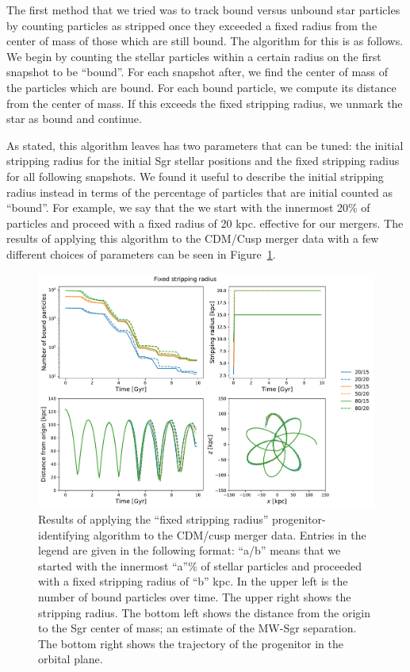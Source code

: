 The first method that we tried was to track bound versus unbound star
particles by counting particles as stripped once they exceeded a fixed radius
from the center of mass of those which are still bound.  The algorithm for
this is as follows.  We begin by counting the stellar particles within a
certain radius on the first snapshot to be ``bound''.  For each snapshot
after, we find the center of mass of the particles which are bound.  For each
bound particle, we compute its distance from the center of mass.  If this
exceeds the fixed stripping radius, we unmark the star as bound and continue.

As stated, this algorithm leaves has two parameters that can be tuned: the
initial stripping radius for the initial Sgr stellar positions and the fixed
stripping radius for all following snapshots. We found it useful to describe the
initial stripping radius instead in terms of the percentage of particles
that are initial counted as ``bound''. For example, we say that the we start
with the innermost 20\% of particles and proceed with a fixed radius of 20 kpc. 
effective for our mergers. The results of applying this algorithm to the
CDM/Cusp merger data with a few different choices of parameters can be seen in
Figure~\ref{fig:fixed_star}.

\begin{figure}
    \centering
    \includegraphics[width=0.9\linewidth]{figs/fixed_star.pdf}
    \caption{%
        Results of applying the ``fixed stripping radius''
        progenitor-identifying algorithm to the CDM/cusp merger data. Entries in
        the legend are given in the following format: ``a/b'' means that we
        started with the innermost ``a''\% of stellar particles and proceeded
        with a fixed stripping radius of ``b'' kpc.  In the upper left is the
        number of bound particles over time.  The upper right shows the
        stripping radius.  The bottom left shows the distance from the origin
        to the Sgr center of mass; an estimate of the MW-Sgr separation.  The
        bottom right shows the trajectory of the progenitor in the orbital
        plane.
    }
    \label{fig:fixed_star}
\end{figure}

